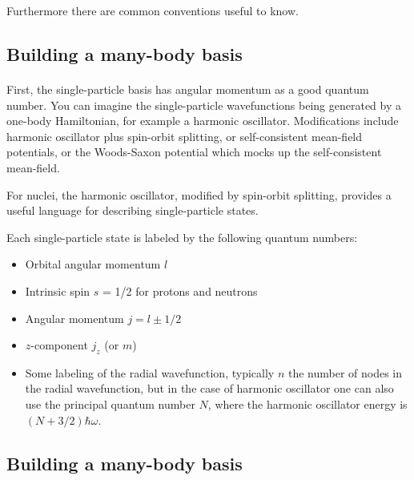 \documentclass[%
twoside,                 %
final,                   %
10pt]{article}
\begin{document}
Furthermore there are common conventions useful to know.




\subsection*{Building a many-body basis}

\paragraph{}
First, the single-particle basis has angular momentum as a good quantum number.  You can 
imagine the single-particle wavefunctions being generated by a one-body Hamiltonian, 
for example a harmonic oscillator.  Modifications include harmonic oscillator plus 
spin-orbit splitting, or self-consistent mean-field potentials, or the Woods-Saxon potential which mocks 
up the self-consistent mean-field. 


For nuclei, the harmonic oscillator, modified by spin-orbit splitting, provides a useful language 
for describing single-particle states.


Each single-particle state is labeled by the following quantum numbers: 

\begin{itemize}
\item Orbital angular momentum $l$

\item Intrinsic spin $s$ = 1/2 for protons and neutrons

\item Angular momentum $j = l \pm 1/2$

\item $z$-component $j_z$ (or $m$)

\item Some labeling of the radial wavefunction, typically $n$ the number of nodes in  the radial wavefunction, but in the case of harmonic oscillator one can also use the principal quantum number $N$, where the harmonic oscillator energy is $(N+3/2)\hbar \omega$. 
\end{itemize}

\noindent




\subsection*{Building a many-body basis}
\end{document}
